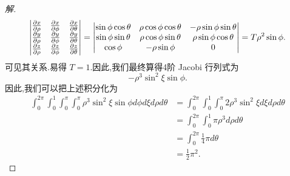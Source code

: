\documentclass[a4paper, 12pt]{article} %
\begin{document}
\begin{CJK}{UTF8}{gkai}
\begin{proof}[解]
\begin{align*}
\begin{vmatrix}
    \frac{\partial x}{\partial\rho}&\frac{\partial x}{\partial\phi}&\frac{\partial
      x}{\partial\theta}\\
    \frac{\partial y}{\partial\rho}&\frac{\partial y}{\partial\phi}&\frac{\partial
      y}{\partial\theta}\\
    \frac{\partial z}{\partial\rho}&\frac{\partial z}{\partial\phi}&\frac{\partial
      z}{\partial\theta}\\
  \end{vmatrix}=
  \begin{vmatrix}
    \sin\phi\cos\theta&\rho\cos\phi\cos\theta&-\rho\sin\phi\sin\theta\\
    \sin\phi\sin\theta&\rho\cos\phi\sin\theta&\rho\sin\phi\cos\theta\\
\cos\phi&-\rho\sin\phi&0\\
  \end{vmatrix}=T\rho^2\sin\phi .
\end{align*}
可见其关系.易得 $T=1$.因此,我们最终算得4阶 Jacobi 行列式为
$$
-\rho^{3}\sin^{2}\xi\sin\phi.
$$
因此,我们可以把上述积分化为
\begin{align*}
\int_0^{2\pi}\int_0^1\int_0^{\pi}\int_0^{\pi}\rho^3\sin^2\xi\sin\phi
 d\phi d\xi d\rho d\theta&=\int_0^{2\pi}\int_0^1\int_0^{\pi}
 2\rho^3\sin^2\xi d\xi d\rho
 d\theta\\&=\int_0^{2\pi}\int_0^1 \pi \rho^3d\rho
 d\theta\\&=\int_0^{2\pi}\frac{1}{4}\pi d\theta\\&=\frac{1}{2}\pi^2.
\end{align*}
\end{proof}
  

  

  
\end{CJK}
\end{document}
